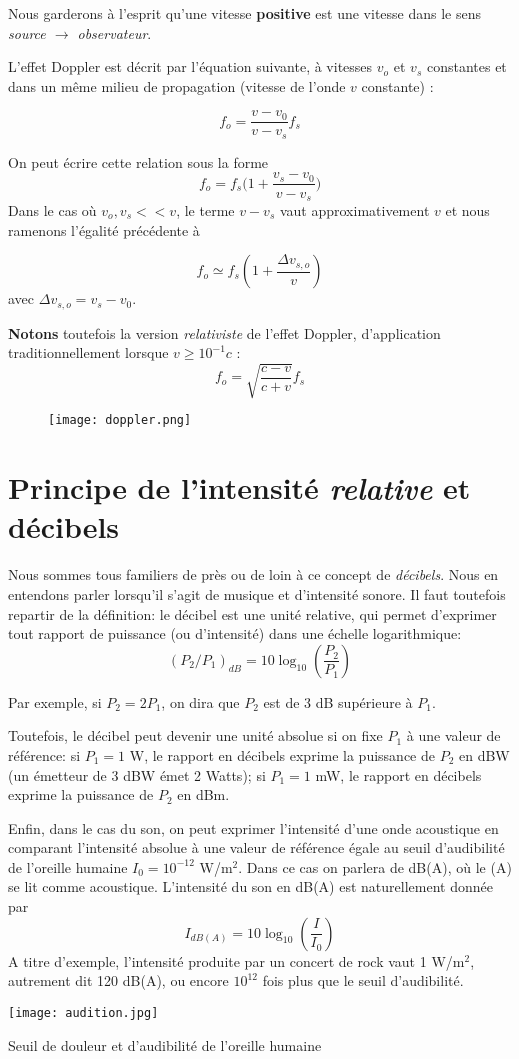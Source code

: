 Nous garderons à l'esprit qu'une vitesse \textbf{positive} est une vitesse dans le sens \textit{source $\rightarrow$ observateur}.

L'effet Doppler est décrit par l'équation suivante, à vitesses $v_{o}$ et $v_{s}$ constantes et dans un même milieu de propagation (vitesse de l'onde $v$ constante) : 

\[f_{o} = \frac{v-v_{0}}{v-v_{s}}f_{s}\]

On peut écrire cette relation sous la forme
$$ f_{o} = f_s\Big(1+\frac{v_s-v_{0}}{v-v_{s}}\Big)$$
Dans le cas où $v_{o},v_{s} << v$, le terme $v-v_s$ vaut approximativement $v$ et nous ramenons l'égalité précédente à 

\[f_{o} \simeq f_{s} (1 + \frac{\Delta v_{s,o}}{v}) \]
avec $\Delta v_{s,o}=v_s-v_0$.

\textbf{Notons} toutefois la version \textit{relativiste} de l'effet Doppler, d'application traditionnellement lorsque $v \geq 10^{-1} c$ : 
\[  f_{o} = \sqrt{\frac{c-v}{c + v}} f_{s}\]

\begin{figure*}
	\texttt{[image: doppler.png]}
\end{figure*}

\section{Principe de l'intensité \textit{relative} et décibels} 

Nous sommes tous familiers de près ou de loin à ce concept de \textit{décibels}. Nous en entendons parler lorsqu'il s'agit de musique et d'intensité sonore. Il faut toutefois repartir de la définition: le décibel est une unité relative, qui permet d'exprimer tout rapport de puissance (ou d'intensité) dans une échelle logarithmique:
\[ (P_2/P_1)_{dB} = 10 \log_{10}\left(\frac{P_2}{P_1}\right) \]

Par exemple, si $P_2 = 2P_1$, on dira que $P_2$ est de 3 dB supérieure à $P_1$. 

Toutefois, le décibel peut devenir une unité absolue si on fixe $P_1$ à une valeur de référence: si $P_1 = 1$ W, le rapport en décibels exprime la puissance de $P_2$ en dBW (un émetteur de 3 dBW émet 2 Watts); si $P_1 = 1$ mW, le rapport en décibels exprime la puissance de $P_2$ en dBm. 

Enfin, dans le cas du son, on peut exprimer l'intensité d'une onde acoustique en comparant l'intensité absolue à une valeur de référence égale au seuil d'audibilité de l'oreille humaine $I_0 = 10^{-12}$ W/m$^2$. Dans ce cas on parlera de dB(A), où le (A) se lit comme acoustique. L'intensité du son en dB(A) est naturellement donnée par 
\[ I_{dB(A)} = 10 \log_{10}\left(\frac{I}{I_{0}}\right) \]
A titre d'exemple, l'intensité produite par un concert de rock vaut 1 W/m$^2$, autrement dit 120 dB(A), ou encore $10^{12}$ fois plus que le seuil d'audibilité. 
\begin{marginfigure}[-5cm]
	\texttt{[image: audition.jpg]}
	\caption{Seuil de douleur et d'audibilité de l'oreille humaine}
\end{marginfigure}
